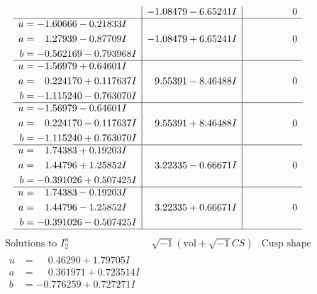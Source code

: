 \documentclass[1p]{elsarticle_modified}
\theoremstyle{definition}
\newcommand{\I}{\sqrt{-1}}
\begin{document}
$$\begin{array}{c|c|c}
 & -1.08479 - 6.65241 I & \phantom{-0.000000 } 0 \\ \hline\begin{aligned}
u &= -1.60666 - 0.21833 I \\
a &= \phantom{-}1.27939 - 0.87709 I \\
b &= -0.562169 - 0.793968 I\end{aligned}
 & -1.08479 + 6.65241 I & \phantom{-0.000000 } 0 \\ \hline\begin{aligned}
u &= -1.56979 + 0.64601 I \\
a &= \phantom{-}0.224170 + 0.117637 I \\
b &= -1.115240 - 0.763070 I\end{aligned}
 & \phantom{-}9.55391 - 8.46488 I & \phantom{-0.000000 } 0 \\ \hline\begin{aligned}
u &= -1.56979 - 0.64601 I \\
a &= \phantom{-}0.224170 - 0.117637 I \\
b &= -1.115240 + 0.763070 I\end{aligned}
 & \phantom{-}9.55391 + 8.46488 I & \phantom{-0.000000 } 0 \\ \hline\begin{aligned}
u &= \phantom{-}1.74383 + 0.19203 I \\
a &= \phantom{-}1.44796 + 1.25852 I \\
b &= -0.391026 + 0.507425 I\end{aligned}
 & \phantom{-}3.22335 - 0.66671 I & \phantom{-0.000000 } 0 \\ \hline\begin{aligned}
u &= \phantom{-}1.74383 - 0.19203 I \\
a &= \phantom{-}1.44796 - 1.25852 I \\
b &= -0.391026 - 0.507425 I\end{aligned}
 & \phantom{-}3.22335 + 0.66671 I & \phantom{-0.000000 } 0\\
 \hline 
 \end{array}$$\newpage$$\begin{array}{c|c|c}  
\text{Solutions to }I^u_{2}& \I (\text{vol} + \sqrt{-1}CS) & \text{Cusp shape}\\
 \hline 
\begin{aligned}
u &= \phantom{-}0.46290 + 1.79705 I \\
a &= \phantom{-}0.361971 + 0.723514 I \\
b &= -0.776259 + 0.727271 I\end{aligned}

\end{array}$$
\end{document}
